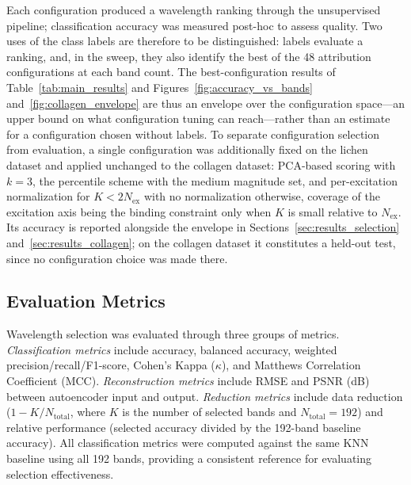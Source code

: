 Each configuration produced a wavelength ranking through the unsupervised pipeline; classification accuracy was measured post-hoc to assess quality.
Two uses of the class labels are therefore to be distinguished: labels evaluate a ranking, and, in the sweep, they also identify the best of the 48 attribution configurations at each band count.
The best-configuration results of Table~\ref{tab:main_results} and Figures~\ref{fig:accuracy_vs_bands} and~\ref{fig:collagen_envelope} are thus an envelope over the configuration space---an upper bound on what configuration tuning can reach---rather than an estimate for a configuration chosen without labels.
To separate configuration selection from evaluation, a single configuration was additionally fixed on the lichen dataset and applied unchanged to the collagen dataset: PCA-based scoring with $k = 3$, the percentile scheme with the medium magnitude set, and per-excitation normalization for $K < 2N_{\text{ex}}$ with no normalization otherwise, coverage of the excitation axis being the binding constraint only when $K$ is small relative to $N_{\text{ex}}$.
Its accuracy is reported alongside the envelope in Sections~\ref{sec:results_selection} and~\ref{sec:results_collagen}; on the collagen dataset it constitutes a held-out test, since no configuration choice was made there.

\subsection{Evaluation Metrics}
\label{sec:metrics}

Wavelength selection was evaluated through three groups of metrics.
\emph{Classification metrics} include accuracy, balanced accuracy, weighted precision/recall/F1-score, Cohen's Kappa ($\kappa$), and Matthews Correlation Coefficient (MCC).
\emph{Reconstruction metrics} include RMSE and PSNR (dB) between autoencoder input and output.
\emph{Reduction metrics} include data reduction ($1 - K/N_{\text{total}}$, where $K$ is the number of selected bands and $N_{\text{total}} = 192$) and relative performance (selected accuracy divided by the 192-band baseline accuracy).
All classification metrics were computed against the same KNN baseline using all 192 bands, providing a consistent reference for evaluating selection effectiveness.